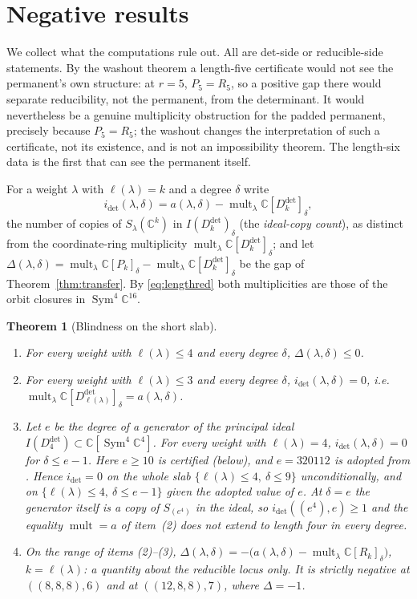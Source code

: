 \documentclass[11pt]{amsart}
\theoremstyle{plain}
\newtheorem{theorem}{Theorem}[section]
\theoremstyle{definition}
\theoremstyle{remark}
\DeclareMathOperator{\Sym}{Sym}
\DeclareMathOperator{\mult}{mult}
\newcommand{\bC}{\mathbb{C}}
\newcommand{\Rr}{R}
\newcommand{\Pp}{P}
\newcommand{\Ddet}{D^{\det}}
\begin{document}
\section{Negative results}\label{sec:negative}

We collect what the computations rule out.  All are det-side or reducible-side
statements.  By the washout theorem a length-five certificate would not see the
permanent's own structure: at $r=5$, $\Pp_5=\Rr_5$, so a positive gap there
would separate reducibility, not the permanent, from the determinant.  It would
nevertheless be a genuine multiplicity obstruction for the padded permanent,
precisely because $\Pp_5=\Rr_5$; the washout changes the interpretation of
such a certificate, not its existence, and is not an impossibility theorem.
The length-six data is the first that can see the permanent itself.

For a weight $\lambda$ with $\ell(\lambda)=k$ and a degree $\delta$ write
\[
  i_{\det}(\lambda,\delta)=a(\lambda,\delta)-\mult_\lambda\bC[\Ddet_k]_\delta ,
\]
the number of copies of $S_\lambda(\bC^k)$ in $I(\Ddet_k)_\delta$ (the
\emph{ideal-copy count}), as distinct from the coordinate-ring multiplicity
$\mult_\lambda\bC[\Ddet_k]_\delta$; and let
$\Delta(\lambda,\delta)=\mult_\lambda\bC[\Pp_k]_\delta-\mult_\lambda\bC[\Ddet_k]_\delta$
be the gap of Theorem~\ref{thm:transfer}.  By \eqref{eq:lengthred} both
multiplicities are those of the orbit closures in $\Sym^{4}\bC^{16}$.

\begin{theorem}[Blindness on the short slab]\label{thm:slab}
\begin{enumerate}
\item For every weight with $\ell(\lambda)\le4$ and every degree $\delta$,
$\Delta(\lambda,\delta)\le0$.
\item For every weight with $\ell(\lambda)\le3$ and every degree $\delta$,
$i_{\det}(\lambda,\delta)=0$, i.e.\
$\mult_\lambda\bC[\Ddet_{\ell(\lambda)}]_\delta=a(\lambda,\delta)$.
\item Let $e$ be the degree of a generator of the principal ideal
$I(\Ddet_4)\subset\bC[\Sym^{4}\bC^{4}]$.  For every weight with
$\ell(\lambda)=4$, $i_{\det}(\lambda,\delta)=0$ for $\delta\le e-1$.  Here
$e\ge10$ is certified (below), and $e=320112$ is adopted from
\cite[Thm.~2]{LLV}.  Hence $i_{\det}=0$ on the whole slab
$\{\ell(\lambda)\le4,\ \delta\le9\}$ unconditionally, and on
$\{\ell(\lambda)\le4,\ \delta\le e-1\}$ given the adopted value of $e$.  At
$\delta=e$ the generator itself is a copy of $S_{(e^{4})}$ in the ideal, so
$i_{\det}((e^{4}),e)\ge1$ and the equality $\mult=a$ of item~(2) does not
extend to length four in every degree.
\item On the range of items (2)--(3),
$\Delta(\lambda,\delta)=-\big(a(\lambda,\delta)-\mult_\lambda\bC[\Rr_k]_\delta\big)$,
$k=\ell(\lambda)$: a quantity about the reducible locus only.  It is strictly
negative at $((8,8,8),6)$ and at $((12,8,8),7)$, where $\Delta=-1$.
\end{enumerate}
\end{theorem}
\end{document}

